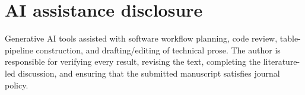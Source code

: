 \documentclass[article]{jss}
\begin{document}
\section*{AI assistance disclosure}
Generative AI tools assisted with software workflow planning, code review, table-pipeline construction, and
drafting/editing of technical prose. The author is responsible for verifying every result, revising the text,
completing the literature-led discussion, and ensuring that the submitted manuscript satisfies journal policy.


\end{document}
